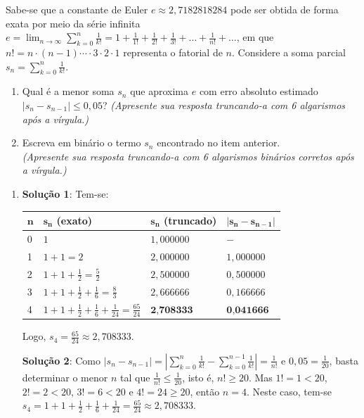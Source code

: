 \documentclass[12pt,a4paper]{article}
\begin{document}
\begin{ExerciseList}
\Exercise[title={2,0}] Sabe-se que a constante de Euler $e \approx 2,7182818284$ pode ser obtida de forma exata por meio da série infinita
$e = \lim_{n\to \infty}  \sum_{k=0}^{n} \frac{1}{k!} = 1 + \frac{1}{1!} + \frac{1}{2!} + \frac{1}{3!} + \ldots + \frac{1}{n!} + \ldots$, em que $n! = n\cdot (n-1) \cdots \cdot 3\cdot 2 \cdot 1$ representa o fatorial de $n$. Considere a soma parcial $s_n = \sum_{k=0}^{n} \frac{1}{k!}$.
\begin{enumerate}
\item Qual é a menor soma $s_n$ que aproxima $e$ com erro absoluto estimado $|s_n - s_{n-1}| \leq 0,05$?
{\color{blue} \textit{(Apresente sua resposta truncando-a com 6 algarismos após a vírgula.)}}
\item Escreva em binário o termo $s_n$ encontrado no item anterior.\\
{\color{blue} \textit{(Apresente sua resposta truncando-a com 6 algarismos binários corretos após a vírgula.)}}
\end{enumerate}

\Answer
\begin{enumerate}
\item \textbf{Solução 1}: Tem-se:
\begin{center}
\begin{tabular}{llll}
\hline
  $\mathbf{n}$
& $\mathbf{s_n}$ (exato)
& $\mathbf{s_n}$ (truncado)
& $\mathbf{|s_n - s_{n-1}|}$\\ \hline
0 & $1$ & $1,000000$ & $-$ \\
1 & $1 + 1 = 2$ & $2,000000$ & $1,000000$ \\
2 & $1 + 1 + \frac{1}{2} = \frac{5}{2}$ & $2,500000$ & $0,500000$ \\
3 & $1 + 1 + \frac{1}{2} + \frac{1}{6} = \frac{8}{3}$ & $2,666666$ & $0,166666$ \\
4 & $1 + 1 + \frac{1}{2} + \frac{1}{6} + \frac{1}{24} = \frac{65}{24}$ & $\textbf{2,708333}$ & $\textbf{0,041666}$ \\ \hline
\end{tabular}
\end{center}

Logo, $s_4 = \frac{65}{24} \approx 2,708333$.

\textbf{Solução 2}: Como $|s_n - s_{n-1}|
= |\sum_{k=0}^{n} \frac{1}{k!} - \sum_{k=0}^{n-1} \frac{1}{k!}|
= \frac{1}{n!}$ e $0,05 = \frac{1}{20}$, basta determinar o menor $n$ tal que $\frac{1}{n!} \leq \frac{1}{20}$, isto é, $n! \geq 20$. Mas $1! = 1 < 20$, $2! = 2 < 20$, $3! = 6 < 20$ e $4! = 24 \geq 20$, então $n = 4$. Neste caso, tem-se $s_4 = 1+1+\frac{1}{2} + \frac{1}{6} + \frac{1}{24} = \frac{65}{24} \approx 2,708333$.


\end{enumerate}
\end{ExerciseList}
\end{document}
